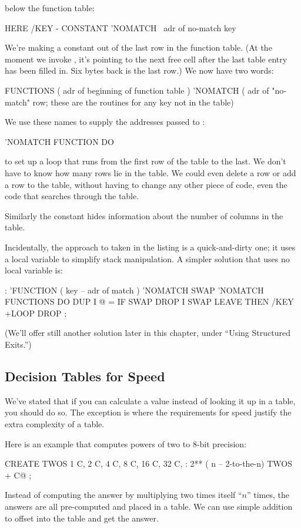 below the function table:
\begin{Code}
HERE /KEY -  CONSTANT 'NOMATCH  \  adr of no-match key
\end{Code}
We're making a constant out of the last row in the function table. (At the
moment we invoke , it's pointing to the next free cell after
the last table entry has been filled in. Six bytes back is the last row.)
We now have two words:
\begin{Code}
FUNCTIONS  ( adr of beginning of function table )
'NOMATCH   ( adr of "no-match" row; these are the
             routines for any key not in the table)
\end{Code}
We use these names to supply the addresses passed to :
\begin{Code}
'NOMATCH FUNCTION DO
\end{Code}
to set up a loop that runs from the first row of the table to the last. We
don't have to know how many rows lie in the table. We could even delete a
row or add a row to the table, without having to change any other piece of
code, even the code that searches through the table.

Similarly the constant  hides information about the number of
columns in the table.

Incidentally, the approach to  taken in the listing is a
quick-and-dirty one; it uses a local variable to simplify stack
manipulation. A simpler solution that uses no local variable is:
\begin{Code}
: 'FUNCTION  ( key -- adr of match )
   'NOMATCH SWAP  'NOMATCH FUNCTIONS DO  DUP
      I @ =  IF SWAP DROP I SWAP  LEAVE  THEN
   /KEY +LOOP  DROP ;
\end{Code}
(We'll offer still another solution later in this chapter, under ``Using
Structured Exits.'')%
%

\subsection{Decision Tables for Speed}

We've stated that if you can calculate a value instead of looking it up in a
table, you should do so. The exception is where the requirements for
speed justify the extra complexity of a table.

Here is an example that computes powers of two to 8-bit precision:

\begin{Code}
CREATE TWOS
   1 C,  2 C,  4 C,  8 C,  16 C,  32 C,
: 2**  ( n -- 2-to-the-n)
   TWOS +  C@ ;
\end{Code}
Instead of computing the answer by multiplying two times itself ``$n$''
times, the answers are all pre-computed and placed in a table. We can use
simple addition to offset into the table and get the answer.

